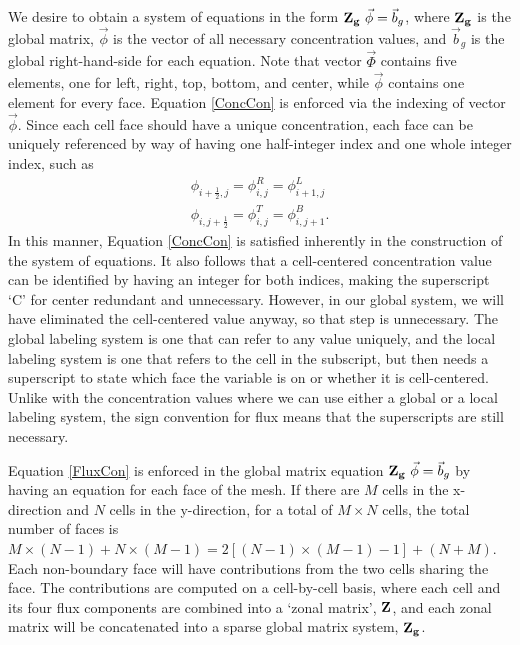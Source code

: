 \documentclass[11pt,letterpaper,oneside,notitlepage]{article}	%
\newcommand{\eq}[1]{Equation \eqref{#1}}		%
\numberwithin{equation}{section}				%
\begin{document}
We desire to obtain a system of equations in the form ${\bf Z_g}\ \vec\phi=\vec b_g$, where $\bf Z_g$ is the global matrix, $\vec\phi$ is the vector of all necessary concentration values, and $\vec b_g$ is the global right-hand-side for each equation.  Note that vector $\vec\Phi$ contains five elements, one for left, right, top, bottom, and center, while $\vec\phi$ contains one element for every face.  \eq{ConcCon} is enforced via the indexing of vector $\vec\phi$. Since each cell face should have a unique concentration,  each face can be uniquely referenced by way of having one half-integer index and one whole integer index, such as
\begin{align*} 
\phi_{i+\tfrac{1}{2},j}=\phi_{i,j}^R=\phi_{i+1,j}^L\\
\phi_{i,j+\tfrac{1}{2}}=\phi_{i,j}^T=\phi_{i,j+1}^B.
\end{align*}
In this manner, \eq{ConcCon} is satisfied inherently in the construction of the system of equations. It also follows that a cell-centered concentration value can be identified by having an integer for both indices, making the superscript `C' for center redundant and unnecessary.  However, in our global system, we will have eliminated the cell-centered value anyway, so that step is unnecessary.  The global labeling system is one that can refer to any value uniquely, and the local labeling system is one that refers to the cell in the subscript, but then needs a superscript to state which face the variable is on or whether it is cell-centered.  Unlike with the concentration values where we can use either a global or a local labeling system, the sign convention for flux means that the superscripts are still necessary.

\eq{FluxCon} is enforced in the global matrix equation ${\bf Z_g}\ \vec\phi=\vec b_g$ by having an equation for each face of the mesh.  If there are $M$ cells in the x-direction and $N$ cells in the y-direction, for a total of $M\times N$ cells, the total number of faces is $M\times (N-1)+N\times (M-1)=2[(N-1)\times(M-1)-1]+(N+M)$.  Each non-boundary face will have contributions from the two cells sharing the face. The contributions are computed on a cell-by-cell basis, where each cell and its four flux components are combined into a `zonal matrix', $\bf Z$, and each zonal matrix will be concatenated into a sparse global matrix system, $\bf Z_g$.
\end{document}
